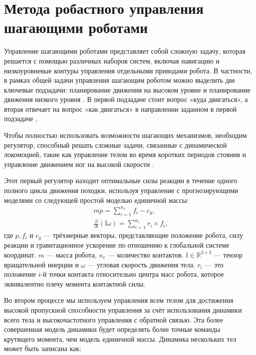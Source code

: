\section{Метода робастного управления шагающими роботами}\label{sec:ch2/sect6}

Управление шагающими роботами представляет собой сложную задачу, которая решается с помощью различных наборов систем, включая навигацию и низкоуровневые контуры управления отдельными приводами робота. В частности, в рамках общей задачи управления шагающим роботом можно выделить две ключевые подзадачи: планирование движения на высоком уровне и планирование движения низкого уровня \cite{WalkingRobots}. В первой подзадаче стоит вопрос «куда двигаться», а вторая отвечает на вопрос «как двигаться» в направлении заданном в первой подзадаче \cite{bib1}.

Чтобы полностью использовать возможности шагающих механизмов, необходим регулятор, способный решать сложные задачи, связанные с динамической локомоцией, такие как управление телом во время коротких периодов стояния и управление движением ног на высокой скорости \cite{KIM2019}.

Этот первый регулятор находит оптимальные силы реакции в течение одного полного цикла движения походки, используя управление с прогнозирующими моделями со следующей простой моделью единичной массы:
\begin{align}
	& m \ddot{p} = \sum_{i=1}^{n_c}f_i-c_g,\\
	& \frac{\partial}{\partial t}(\mathbb{I} \omega) = \sum_{i=1}^{n_c} r_i \times f_i,
\end{align}
где $p, f_i$ и $c_g$ --- трёхмерные векторы, представляющие положение робота, силу реакции и гравитационное ускорение по отношению к глобальной системе координат. $m$ --- масса робота, $n_c$ --- количество контактов. $\mathbb{I} \in \mathbb{R}^{3\times 3}$ --- тензор вращательной инерции и $\omega$ --- угловая скорость движения тела. $r_i$ --- это положение $i$-й точки контакта относительно центра масс робота, которое эквивалентно плечу момента контактной силы.

Во втором процессе мы используем управления всем телом для достижения высокой пропускной способности управления за счёт использования динамики всего тела и высокочастотного управления с обратной связью. Эта более совершенная модель динамики будет определять более точные команды крутящего момента, чем модель единичной массы. Динамика нескольких тел может быть записана как:

